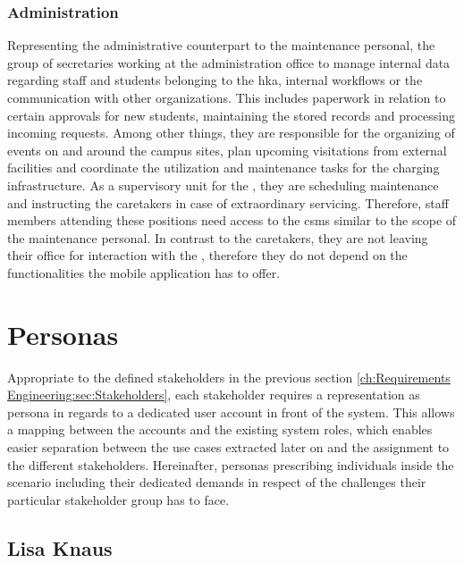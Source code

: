 \subsubsection{Administration}
\label{ch:Requirements Engineering:sec:Stakeholders:ssec:Staff:sssec:Administration}

Representing the administrative counterpart to the maintenance personal, the group of secretaries working at the administration office to manage internal data regarding staff and students belonging to the \acrshort{hka}, internal workflows or the communication with other organizations. 
This includes paperwork in relation to certain approvals for new students, maintaining the stored records and processing incoming requests. Among other things, they are responsible for the organizing of events on and around the campus sites, plan upcoming visitations from external facilities and coordinate the utilization and maintenance tasks for the charging infrastructure.
As a supervisory unit for the , they are scheduling maintenance and instructing the caretakers in case of extraordinary servicing.  
Therefore, staff members attending these positions need access to the \acrshort{csms} similar to the scope of the maintenance personal. In contrast to the caretakers, they are not leaving their office for interaction with the , therefore they do not depend on the functionalities the mobile application has to offer.

\section{Personas}
\label{ch:Requirements Engineering:sec:Personas}

Appropriate to the defined stakeholders in the previous section \ref{ch:Requirements Engineering:sec:Stakeholders}, each stakeholder requires a representation as persona in regards to a dedicated user account in front of the system.
This allows a mapping between the accounts and the existing system roles, which enables easier separation between the use cases extracted later on and the assignment to the different stakeholders. 
Hereinafter, personas prescribing individuals inside the scenario including their dedicated demands in respect of the challenges their particular stakeholder group has to face. 

\subsection{Lisa Knaus}
\label{ch:Requirements Engineering:sec:Personas:ssec:Lisa Knaus}

